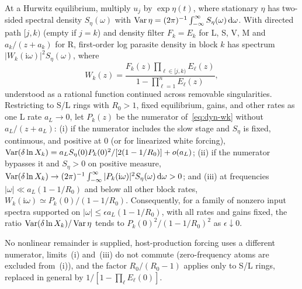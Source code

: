 \begin{proposition}\label{prop:dyn-k9}
At a Hurwitz equilibrium, multiply $u_j$ by $\exp\eta(t)$, where stationary $\eta$ has two-sided spectral density $S_\eta(\omega)$ with $\operatorname{Var}\eta = (2\pi)^{-1}\int_{-\infty}^\infty S_\eta(\omega)\,\mathrm{d}\omega$. With directed path $[j, k)$ (empty if $j = k$) and density filter $F_k = E_k$ for L, S, V, M and $a_k/(z + a_k)$ for R, first-order log parasite density in block $k$ has spectrum $|W_k(\mathrm{i}\omega)|^2 S_\eta(\omega)$, where
\begin{equation}\label{eq:dyn-wk}
W_k(z) = \frac{F_k(z)\prod_{\ell \in [j, k)} E_\ell(z)}{1 - \prod_{\ell=1}^n E_\ell(z)},
\end{equation}
understood as a rational function continued across removable singularities.
Restricting to S/L rings with $R_0 > 1$, fixed equilibrium, gains, and other rates as one L rate $a_L \to 0$, let $P_k(z)$ be the numerator of~\eqref{eq:dyn-wk} without $a_L/(z + a_L)$: (i) if the numerator includes the slow stage and $S_\eta$ is fixed, continuous, and positive at $0$ (or for linearized white forcing), $\operatorname{Var}(\delta\ln X_k) = a_L S_\eta(0) P_k(0)^2 / [2(1 - 1/R_0)] + o(a_L)$; (ii) if the numerator bypasses it and $S_\eta > 0$ on positive measure, $\operatorname{Var}(\delta\ln X_k) \to (2\pi)^{-1}\int_{-\infty}^\infty |P_k(\mathrm{i}\omega)|^2 S_\eta(\omega)\,\mathrm{d}\omega > 0$; and (iii) at frequencies $|\omega|\ll a_L(1-1/R_0)$ and below all other block rates, $W_k(\mathrm i\omega)\simeq P_k(0)/(1-1/R_0)$. Consequently, for a family of nonzero input spectra supported on $|\omega|\leq\epsilon a_L(1-1/R_0)$, with all rates and gains fixed, the ratio $\operatorname{Var}(\delta\ln X_k)/\operatorname{Var}\eta$ tends to $P_k(0)^2/(1-1/R_0)^2$ as $\epsilon\downarrow0$.
\end{proposition}

No nonlinear remainder is supplied, host-production forcing uses a different numerator, limits~(i) and~(iii) do not commute (zero-frequency atoms are excluded from~(i)), and the factor $R_0/(R_0 - 1)$ applies only to S/L rings, replaced in general by $1/[1 - \prod_\ell E_\ell(0)]$.


